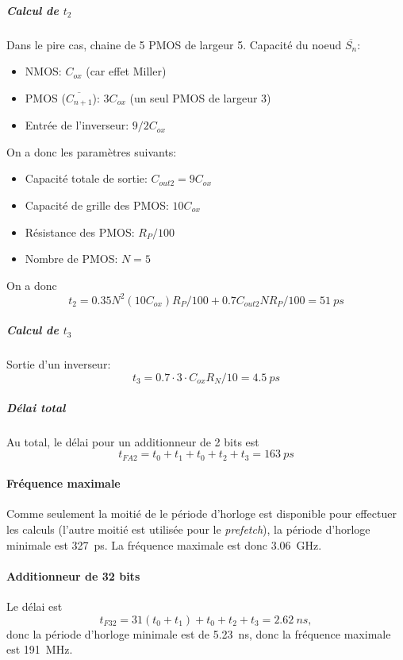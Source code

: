 \documentclass[frenchb,DIV=14]{scrartcl}
\begin{document}
\subparagraph{Calcul de $t_2$}
Dans le pire cas, chaine de 5 PMOS de largeur 5.
Capacité du noeud $\overline{S_n}$:
\begin{itemize}
    \item NMOS: $C_{ox}$ (car effet Miller)
    \item PMOS ($\overline{C_{n+1}}$): $3C_{ox}$ (un seul PMOS de largeur 3)
    \item Entrée de l'inverseur: $9/2 C_{ox}$
\end{itemize}

On a donc les paramètres suivants:
\begin{itemize}
    \item Capacité totale de sortie: $C_{out2} = 9 C_{ox}$
    \item Capacité de grille des PMOS: $10 C_{ox}$
    \item Résistance des PMOS: $R_P/100$
    \item Nombre de PMOS: $N = 5$
\end{itemize}
On a donc
\[t_2 = 0.35 N^2 (10C_{ox}) R_P/100 + 0.7 C_{out2} N R_P/100 = \SI{51}{ps}\]

\subparagraph{Calcul de $t_3$}
Sortie d'un inverseur:
\[t_3 = 0.7 \cdot 3 \cdot C_{ox} R_N/10 = \SI{4.5}{ps}\]

\subparagraph{Délai total}
Au total, le délai pour un additionneur de 2 bits est
\[t_{FA2} = t_0 + t_1 + t_0 + t_2 + t_3 = \SI{163}{ps}\]

\paragraph{Fréquence maximale}
Comme seulement la moitié de le période d'horloge est disponible pour
effectuer les calculs (l'autre moitié est utilisée pour le \emph{prefetch}),
la période d'horloge minimale est \SI{327}{ps}. La fréquence maximale est
donc \SI{3.06}{GHz}.

\paragraph{Additionneur de 32 bits}
Le délai est
\[t_{F32} = 31 (t_0 + t_1) + t_0 + t_2 + t_3 = \SI{2.62}{ns},\]
donc la période d'horloge minimale est de \SI{5.23}{ns}, donc la
fréquence maximale est \SI{191}{MHz}.
\end{document}
